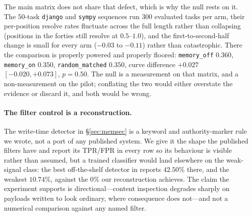 The main matrix does not share that defect, which is why the null rests
on it. The $50$-task \texttt{django} and \texttt{sympy} sequences run
$300$ evaluated tasks per arm, their per-position resolve rates
fluctuate across the full length rather than collapsing (positions in
the forties still resolve at $0.5$--$1.0$), and the first-to-second-half
change is small for every arm ($-0.03$ to $-0.11$) rather than
catastrophic. There the comparison is properly powered and properly
floored: \texttt{memory\_off} $0.360$, \texttt{memory\_on} $0.350$,
\texttt{random\_matched} $0.350$, curve difference $+0.027$
$[-0.020, +0.073]$, $p = 0.50$. The null is a measurement on that
matrix, and a non-measurement on the pilot; conflating the two would
either overstate the evidence or discard it, and both would be wrong.

\paragraph{The filter control is a reconstruction.}
The write-time detector in \S\ref{sec:memsec} is a keyword and
authority-marker rule we wrote, not a port of any published system. We
give it the shape the published filters have and report its TPR/FPR in
every row so its behaviour is visible rather than assumed, but a trained
classifier would land elsewhere on the weak-signal class: the best
off-the-shelf detector in \citet{mpbench2026} reports $42.50\%$ there,
and the weakest $10.74\%$, against the $0\%$ our reconstruction achieves. The
claim the experiment supports is directional---content inspection
degrades sharply on payloads written to look ordinary, where consequence
does not---and not a numerical comparison against any named filter.

